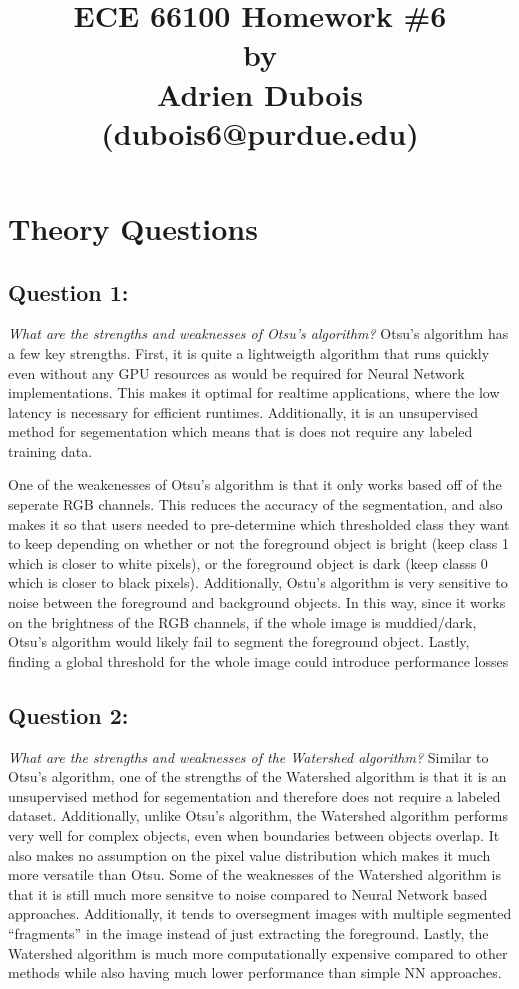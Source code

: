 \documentclass{article}
\title{\Large \textbf{ECE 66100 Homework \#6\\[0.1in] by\\ [0.1in] Adrien Dubois (dubois6@purdue.edu)}}
\begin{document}
\maketitle
\tableofcontents

\section{Theory Questions}
\subsection{Question 1:}
\textit{What are the strengths and weaknesses of Otsu's algorithm?}
Otsu's algorithm has a few key strengths. First, it is quite a lightweigth algorithm that runs quickly even without
any GPU resources as would be required for Neural Network implementations. This makes it optimal for realtime applications,
where the low latency is necessary for efficient runtimes. Additionally, it is an unsupervised method
for segementation which means that is does not require any labeled training data.

One of the weakenesses of Otsu's algorithm is that it only works based off of the seperate RGB channels. This reduces
the accuracy of the segmentation, and also makes it so that users needed to pre-determine which thresholded class they
want to keep depending on whether or not the foreground object is bright (keep class 1 which is closer to white pixels), 
or the foreground object is dark (keep classs 0 which is closer to black pixels). Additionally, Ostu's algorithm is very
sensitive to noise between the foreground and background objects. In this way, since it works on the brightness of the RGB
channels, if the whole image is muddied/dark, Otsu's algorithm would likely fail to segment the foreground object. Lastly,
finding a global threshold for the whole image could introduce performance losses 

\subsection{Question 2:}
\textit{What are the strengths and weaknesses of the Watershed algorithm?}
Similar to Otsu's algorithm, one of the strengths of the Watershed algorithm is that it is an unsupervised method for 
segementation and therefore does not require a labeled dataset. Additionally, unlike Otsu's algorithm, the Watershed algorithm
performs very well for complex objects, even when boundaries between objects overlap. It also makes no assumption on the pixel
value distribution which makes it much more versatile than Otsu.
Some of the weaknesses of the Watershed algorithm is that it is still much more sensitve to noise compared to Neural Network 
based approaches. Additionally, it tends to oversegment images with multiple segmented ``fragments'' in the image instead of
just extracting the foreground. Lastly, the Watershed algorithm is much more computationally expensive compared to other methods
while also having much lower performance than simple NN approaches.
\end{document}
